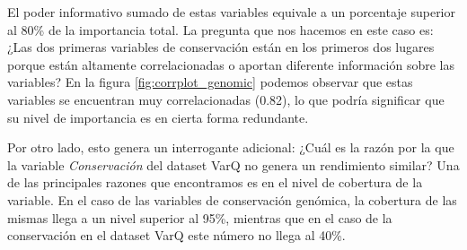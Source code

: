 El poder informativo sumado de estas variables equivale a un porcentaje superior al 80\% de la importancia total. La pregunta que nos hacemos en este caso es: ¿Las dos primeras variables de conservación están en los primeros dos lugares porque están altamente correlacionadas o aportan diferente información sobre las variables? En la figura \ref{fig:corrplot_genomic} podemos observar que estas variables se encuentran muy correlacionadas (0.82), lo que podría significar que su nivel de importancia es en cierta forma redundante. 

Por otro lado, esto genera un interrogante adicional: ¿Cuál es la razón por la que la variable \textit{Conservación} del dataset VarQ no genera un rendimiento similar? Una de las principales razones que encontramos es en el nivel de cobertura de la variable. En el caso de las variables de conservación genómica, la cobertura de las mismas llega a un nivel superior al 95\%, mientras que en el caso de la conservación en el dataset VarQ este número no llega al 40\%. 

\newpage


